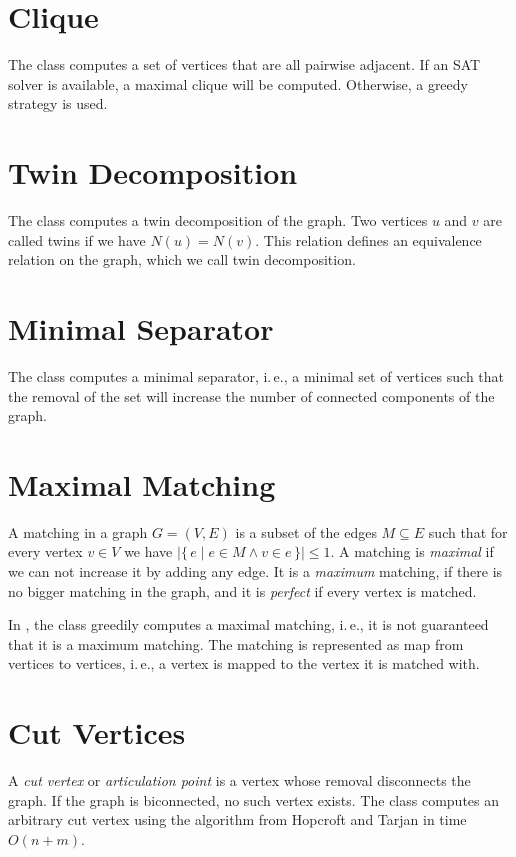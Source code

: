 \documentclass[a4paper, ukenglish, twoside, openright]{jdrasilmanual}
\begin{document}
\section{Clique}
The class  computes a set of vertices that are all pairwise adjacent. If an SAT
solver is available, a maximal clique will be computed. Otherwise, a
greedy strategy is used.

\section{Twin Decomposition}
The class  computes a twin decomposition of
the graph. Two vertices $u$ and $v$ are
called twins if we have $N(u)=N(v)$. This relation defines an
equivalence relation on the graph, which we call twin decomposition.

\section{Minimal Separator}
The class  computes a minimal separator, i.\,e., a minimal set of vertices such
that the removal of the set will increase the number of connected
components of the graph.

\section{Maximal Matching}
A matching in a graph \(G=(V,E)\) is a subset of the edges
\(M\subseteq E\) such that for every vertex \(v\in V\) we have
\(|\{\,e\mid e\in M\wedge v\in e\,\}|\leq 1\). A matching is \emph{maximal} if
we can not increase it by adding any edge. It is a \emph{maximum} matching,
if there is no bigger matching in the graph, and it is \emph{perfect} if
every vertex is matched.
  
In \Jdrasil, the class  greedily computes a maximal matching, i.\,e., it is not
guaranteed that it is a maximum matching. The matching is represented
as map from vertices to vertices, i.\,e., a vertex is mapped to the
vertex it is matched with.

\section{Cut Vertices}
A \emph{cut vertex} or \emph{articulation point} is a vertex whose removal
disconnects the graph. If the graph is biconnected, no such vertex
exists. The class  computes an arbitrary cut vertex using the
algorithm from Hopcroft and Tarjan in time $O(n+m)$.
 
\end{document}
